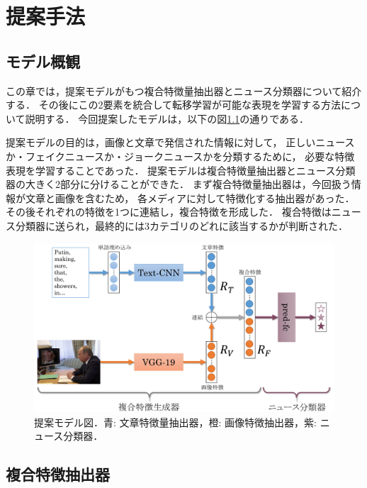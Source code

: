%
\chapter{提案手法}\label{ch:methodology}
%
\section{モデル概観}
この章では，提案モデルがもつ複合特徴量抽出器とニュース分類器について紹介する．
その後にこの2要素を統合して転移学習が可能な表現を学習する方法について説明する．
今回提案したモデルは，以下の図\ref{fig:model}の通りである．

提案モデルの目的は，画像と文章で発信された情報に対して，
正しいニュースか・フェイクニュースか・ジョークニュースかを分類するために，
必要な特徴表現を学習することであった．
提案モデルは複合特徴量抽出器とニュース分類器の大きく2部分に分けることができた．
まず複合特徴量抽出器は，今回扱う情報が文章と画像を含むため，
各メディアに対して特徴化する抽出器があった．
その後それぞれの特徴を1つに連結し，複合特徴を形成した．
複合特徴はニュース分類器に送られ，最終的には3カテゴリのどれに該当するかが判断された．
% 
\begin{figure}[H]
    \centering
    \includegraphics[width=\linewidth]{images/methodology.pdf}
    \caption{提案モデル図．青: 文章特徴量抽出器，橙: 画像特徴抽出器，紫: ニュース分類器．}
    \label{fig:model}
\end{figure}
%
\section{複合特徴抽出器}
%

